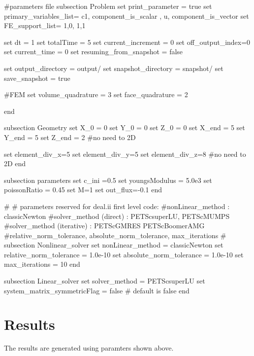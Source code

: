 \begin{DoxyCode}
\textcolor{preprocessor}{#parameters file}
\textcolor{preprocessor}{}
subsection Problem
set print\_parameter = \textcolor{keyword}{true}
set primary\_variables\_list= c1, component\_is\_scalar , u, component\_is\_vector
set FE\_support\_list= 1,0,  1,1

set dt = 1
set totalTime = 5
set current\_increment = 0
set off\_output\_index=0
set current\_time = 0
set resuming\_from\_snapshot = \textcolor{keyword}{false}

set output\_directory = output/
set snapshot\_directory = snapshot/
set save\_snapshot = \textcolor{keyword}{true}

\textcolor{preprocessor}{#FEM}
\textcolor{preprocessor}{}set volume\_quadrature = 3 
set face\_quadrature = 2 

end

subsection Geometry
set X\_0 = 0
set Y\_0 = 0
set Z\_0 = 0
set X\_end = 5 
set Y\_end = 5
set Z\_end = 2 #no need to 2D

set element\_div\_x=5
set element\_div\_y=5
set element\_div\_z=8 #no need to 2D
end

subsection parameters
set c\_ini =0.5
set youngsModulus =  5.0e3
set poissonRatio =  0.45
set M=1 
set out\_flux=-0.1
end
                        
\textcolor{preprocessor}{#}
\textcolor{preprocessor}{}\textcolor{preprocessor}{# parameters reserved for deal.ii first level code:}
\textcolor{preprocessor}{}\textcolor{preprocessor}{#nonLinear\_method : classicNewton}
\textcolor{preprocessor}{}\textcolor{preprocessor}{#solver\_method (direct) : PETScsuperLU, PETScMUMPS}
\textcolor{preprocessor}{}\textcolor{preprocessor}{#solver\_method (iterative) : PETScGMRES PETScBoomerAMG}
\textcolor{preprocessor}{}\textcolor{preprocessor}{#relative\_norm\_tolerance, absolute\_norm\_tolerance, max\_iterations}
\textcolor{preprocessor}{}\textcolor{preprocessor}{#}
\textcolor{preprocessor}{}subsection Nonlinear\_solver
        set nonLinear\_method = classicNewton
        set relative\_norm\_tolerance = 1.0e-10
        set absolute\_norm\_tolerance = 1.0e-10
        set max\_iterations = 10
end
                        
subsection Linear\_solver
        set solver\_method = PETScsuperLU
        set system\_matrix\_symmetricFlag = \textcolor{keyword}{false} # \textcolor{keywordflow}{default} is \textcolor{keyword}{false}
end
\end{DoxyCode}
 \hypertarget{growth_results}{}\section{Results}\label{growth_results}
The results are generated using paramters shown above.

  